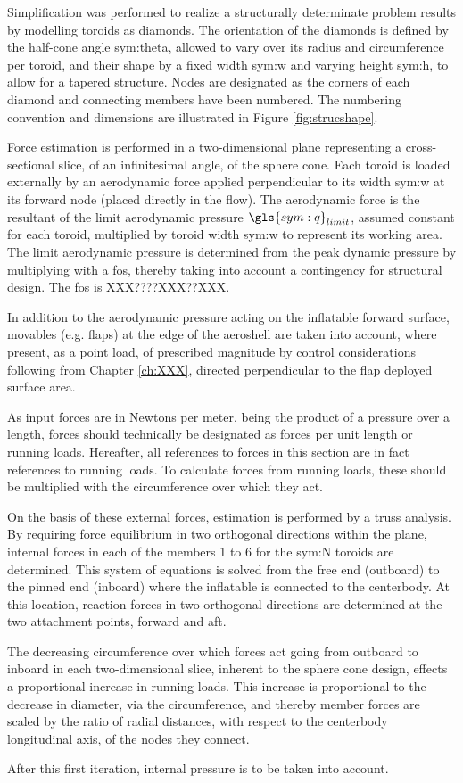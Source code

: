 Simplification was performed to realize a structurally determinate problem results by modelling toroids as diamonds. The orientation of the diamonds is defined by the half-cone angle \gls{sym:theta}, allowed to vary over its radius and circumference per toroid, and their shape by a fixed width \gls{sym:w} and varying height \gls{sym:h}, to allow for a tapered structure. Nodes are designated as the corners of each diamond and connecting members have been numbered. The numbering convention and dimensions are illustrated in Figure \ref{fig:strucshape}. 

Force estimation is performed in a two-dimensional plane representing a cross-sectional slice, of an infinitesimal angle, of the sphere cone. Each toroid is loaded externally by an aerodynamic force applied perpendicular to its width \gls{sym:w} at its forward node (placed directly in the flow). The aerodynamic force is the resultant of the limit aerodynamic pressure $\gls{sym:q}_{limit}$, assumed constant for each toroid, multiplied by toroid width \gls{sym:w} to represent its working area. The limit aerodynamic pressure is determined from the peak dynamic pressure by multiplying with a \acrfull{fos}, thereby taking into account a contingency for structural design. The \gls{fos} is XXX????XXX??XXX. 

In addition to the aerodynamic pressure acting on the inflatable forward surface, movables (e.g. flaps) at the edge of the aeroshell are taken into account, where present, as a point load, of prescribed magnitude by control considerations following from Chapter \ref{ch:XXX}, directed perpendicular to the flap deployed surface area.

As input forces are in Newtons per meter, being the product of a pressure over a length, forces should technically be designated as forces per unit length or running loads. Hereafter, all references to forces in this section are in fact references to running loads. To calculate forces from running loads, these should be multiplied with the circumference over which they act.

On the basis of these external forces, estimation is performed by a truss analysis. By requiring force equilibrium in two orthogonal directions within the plane, internal forces in each of the members 1 to 6 for the \gls{sym:N} toroids are determined. This system of equations is solved from the free end (outboard) to the pinned end (inboard) where the inflatable is connected to the centerbody. At this location, reaction forces in two orthogonal directions are determined at the two attachment points, forward and aft.

The decreasing circumference over which forces act going from outboard to inboard in each two-dimensional slice, inherent to the sphere cone design, effects a proportional increase in running loads. This increase is proportional to the decrease in diameter, via the circumference, and thereby member forces are scaled by the ratio of radial distances, with respect to the centerbody longitudinal axis, of the nodes they connect.

After this first iteration, internal pressure is to be taken into account.
